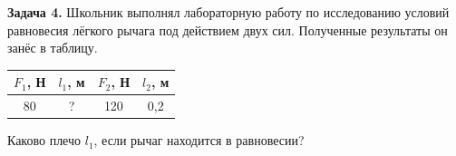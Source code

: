 \begin{taskbasic}[code={\label{task:statics_v02_n04}}]
\textbf{Задача 4.} Школьник выполнял лабораторную работу по исследованию условий равновесия лёгкого рычага под действием двух сил. Полученные результаты он занёс в таблицу.

\begin{center}
\begin{tabular}{|c|c|c|c|}
\hline
$F_{1}$, Н & $l_{1}$, м & $F_{2}$, Н & $l_{2}$, м \\ \hline
80 & ? & 120 & 0{,}2 \\ \hline
\end{tabular}
\end{center}

Каково плечо $l_{1}$, если рычаг находится в равновесии?

\end{taskbasic}

